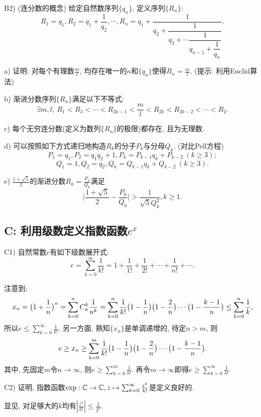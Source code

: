 B2) (连分数的概念) 给定自然数序列$\{ q_n \}$, 定义序列$\{ R_n \}$: $$R_1=q_1, R_2=q_1+\frac{1}{q_2}, \cdots ,R_n = q_1 + \dfrac{1}{q_2 
          + \dfrac{1}{q_3 
          + \cdots \dfrac{1}{q_{n-1}+\dfrac{1}{q_n}}  } }.$$
          
a) 证明: 对每个有理数$\frac{m}{l}$, 均存在唯一的$n$和$\{ q_n \}$使得$R_n=\frac{m}{l}$. (提示: 利用Euclid算法)

b) 渐进分数序列$\{ R_n \}$满足以下不等式: $$\exists m,l,~ R_1<R_3< \cdots <R_{2k-1} < \frac{m}{l} < R_{2k} < R_{2k-2} < \cdots < R_2.$$

c) 每个无穷连分数(定义为数列$\{ R_n \}$的极限)都存在, 且为无理数. 

d) 可以按照如下方式递归地构造$R_k$的分子$P_k$与分母$Q_k$. (对比Pell方程)
$$P_1=q_1, P_2=q_1q_2+1, P_k=P_{k-1}q_k+P_{k-2}~(k \geq 3); $$
$$Q_1=1, Q_2=q_2, Q_k=Q_{k-1}q_k+Q_{k-2}~(k \geq 3).$$

e) $\frac{1+\sqrt{5}}{2}$的渐进分数$R_k=\frac{P_k}{Q_k}$满足$$\big| \frac{1+\sqrt{5}}{2} - \frac{P_k}{Q_k} \big|>\frac{1}{\sqrt{5} Q_k^2}, k \geq 1.$$

\subsection*{C: 利用级数定义指数函数$e^x$} %

C1) 自然常数$e$有如下级数展开式:$$e = \sum_{k=0}^{\infty} \frac{1}{k!} = 1+\frac{1}{1!}+\frac{1}{2!} + \cdots + \frac{1}{n!} + \cdots .$$

\begin{solution}
	注意到: $$x_n = \big( 1+\frac{1}{n} \big)^n = \sum_{k=0}^{n} C_n^k \frac{1}{n^k} = \sum_{k=0}^{n} \frac{1}{k!} \big( 1-\frac{1}{n} \big) \big( 1-\frac{2}{n} \big) \cdots \big( 1-\frac{k-1}{n} \big) \leq \sum_{k=0}^{n} \frac{1}{k}, $$
	所以$e \leq \sum_{k=0}^{\infty} \frac{1}{k!}$. 另一方面, 熟知$\{ x_n \}$是单调递增的, 待定$n>m$, 则$$e \geq x_n \geq \sum_{k=0}^{m} \frac{1}{k!} \big( 1-\frac{1}{n} \big) \big( 1-\frac{2}{n} \big) \cdots \big( 1-\frac{k-1}{n} \big). $$
	其中, 先固定$m$令$n \to \infty$, 则$e \geq \sum_{k=0}^{m} \frac{1}{k!}$. 再令$m \to \infty$即得$e \geq \sum_{k=0}^{\infty} \frac{1}{k!}$. 
\end{solution}

C2) 证明, 指数函数${\rm exp} : \mathbb{C} \to \mathbb{C}, z \mapsto \sum_{k=0}^{\infty} \frac{z^k}{k!}$是定义良好的. 

\begin{solution}
	显见, 对足够大的$k$均有$|\frac{z^k}{k!} | \leq \frac{1}{2^k}$. 
\end{solution}


